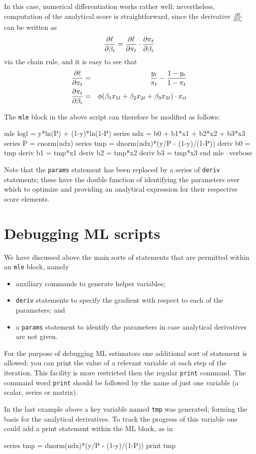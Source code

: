 In this case, numerical differentiation works rather well;
nevertheless, computation of the analytical score is straightforward,
since the derivative $\frac{\partial \ell}{\partial \beta_i}$ can be written as
\[
  \frac{\partial \ell}{\partial \beta_i} = \frac{\partial \ell}{\partial \pi_t} \cdot \frac{\partial \pi_t}{\partial \beta_i}
\]
via the chain rule, and it is easy to see that
\begin{eqnarray*}
  \frac{\partial \ell}{\partial \pi_t} & = & \frac{y_t}{\pi_t} - \frac{1 - y_t}{1 -
    \pi_t} \\
  \frac{\partial \pi_t}{\partial \beta_i} & = & \phi(\beta_1 x_{1t} + \beta_2 x_{2t} +
  \beta_3 x_{3t}) \cdot x_{it}
\end{eqnarray*}

The \texttt{mle} block in the above script can therefore be modified
as follows:
%
\begin{code}
mle logl = y*ln(P) + (1-y)*ln(1-P)
  series ndx = b0 + b1*x1 + b2*x2 + b3*x3
  series P = cnorm(ndx)
  series tmp = dnorm(ndx)*(y/P - (1-y)/(1-P))
  deriv b0 = tmp
  deriv b1 = tmp*x1
  deriv b2 = tmp*x2
  deriv b3 = tmp*x3
end mle --verbose
\end{code}

Note that the \texttt{params} statement has been replaced by a series
of \texttt{deriv} statements; these have the double function of
identifying the parameters over which to optimize and providing an
analytical expression for their respective score elements.

\section{Debugging ML scripts}
\label{sec:mle-debug}

We have discussed above the main sorts of statements that are
permitted within an \texttt{mle} block, namely 
%
\begin{itemize}
\item auxiliary commands to generate helper variables;
\item \texttt{deriv} statements to specify the gradient with respect
  to each of the parameters; and
\item a \texttt{params} statement to identify the parameters in case
  analytical derivatives are not given.
\end{itemize}

For the purpose of debugging ML estimators one additional sort of
statement is allowed: you can print the value of a relevant variable
at each step of the iteration.  This facility is more restricted then
the regular \texttt{print} command.  The command word \texttt{print}
should be followed by the name of just one variable (a scalar, series
or matrix).

In the last example above a key variable named \texttt{tmp} was
generated, forming the basis for the analytical derivatives.  To track
the progress of this variable one could add a print statement within
the ML block, as in
%
\begin{code}
  series tmp = dnorm(ndx)*(y/P - (1-y)/(1-P))
  print tmp
\end{code}




